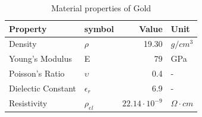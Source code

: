 \begin{table}[H]
	\centering
	\begin{tabular}{l l r l} 
		\toprule
		Property & symbol & Value & Unit \\
		\midrule
		Density & $\rho$ & 19.30 & $g/cm^3$ \\
		Young's Modulus & E & 79 & GPa \\ 
		Poisson's Ratio & $\upsilon$ & 0.4 & - \\ 
		Dielectic Constant & $\epsilon_r$ & 6.9 & - \\
		Resistivity & $\rho_{el}$ & $22.14\cdot10^{-9} $ & $\Omega \cdot cm$ \\
		\bottomrule
	\end{tabular}
	\caption{Material properties of Gold}
	\label{tab:gold_mat}
\end{table}
